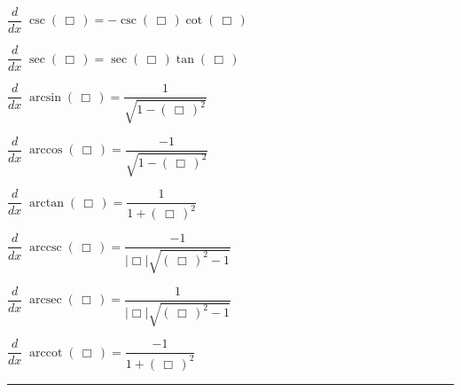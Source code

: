 \documentclass[11pt,letterpaper]{article}
\newenvironment{2enumerate}{%
	\begin{itemize}
	\begin{multicols}{2}
	}{%
	\end{multicols}
	\end{itemize}
}
\DeclareMathOperator{\arccsc}{arccsc}
\DeclareMathOperator{\arcsec}{arcsec}
\DeclareMathOperator{\arccot}{arccot}
\begin{document}
\begin{2enumerate}
\item $\dfrac{d}{dx}\; \csc \left(\, \Box \,\right) = -\csc \left(\, \Box \,\right) \cot \left(\, \Box \,\right)$ \par\vspace{0.05cm}
\item $\dfrac{d}{dx}\; \sec \left(\, \Box \,\right) = \sec \left(\, \Box \,\right) \tan \left(\, \Box \,\right)$ \par\vspace{0.05cm}
\item $\dfrac{d}{dx}\; \arcsin \left(\, \Box \,\right) = \dfrac{1}{\sqrt{1 - \left(\, \Box \,\right)^2}}$ \par\vspace{0.05cm}
\item $\dfrac{d}{dx}\; \arccos \left(\, \Box \,\right) = \dfrac{-1}{\sqrt{1 - \left(\, \Box \,\right)^2}}$ \par\vspace{0.05cm}
\item $\dfrac{d}{dx}\; \arctan \left(\, \Box \,\right) = \dfrac{1}{1 + \left(\, \Box \,\right)^2}$ \par\vspace{0.05cm}
\item $\dfrac{d}{dx}\; \arccsc \left(\, \Box \,\right) = \dfrac{-1}{| \Box | \sqrt{\left(\, \Box \,\right)^2 - 1}}$ \par\vspace{0.05cm}
\item $\dfrac{d}{dx}\; \arcsec \left(\, \Box \,\right) = \dfrac{1}{| \Box | \sqrt{\left(\, \Box \,\right)^2 - 1}}$ \par\vspace{0.05cm}
\item $\dfrac{d}{dx}\; \arccot \left(\, \Box \,\right) = \dfrac{-1}{1 + \left(\, \Box \,\right)^2}$ \par\vspace{0.05cm}
\end{2enumerate}

\noindent\rule{\textwidth}{1pt}
\end{document}
